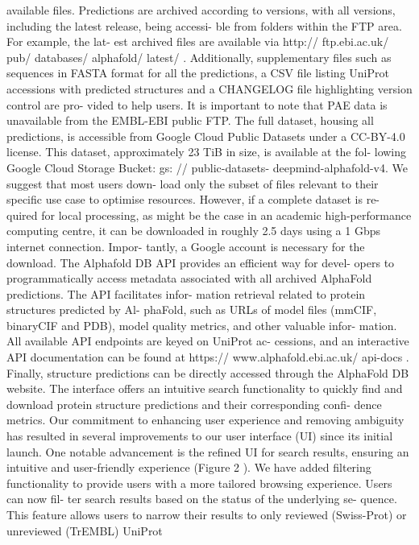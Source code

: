 available files. Predictions are archived according to versions,
with all versions, including the latest release, being accessi-
ble from folders within the FTP area. For example, the lat-
est archived files are available via http:// ftp.ebi.ac.uk/ pub/
databases/ alphafold/ latest/ . Additionally, supplementary files
such as sequences in FASTA format for all the predictions, a
CSV file listing UniProt accessions with predicted structures
and a CHANGELOG file highlighting version control are pro-
vided to help users. It is important to note that PAE data is
unavailable from the EMBL-EBI public FTP.
The full dataset, housing all predictions, is accessible from
Google Cloud Public Datasets under a CC-BY-4.0 license. This
dataset, approximately 23 TiB in size, is available at the fol-
lowing Google Cloud Storage Bucket: gs: // public-datasets-
deepmind-alphafold-v4. We suggest that most users down-
load only the subset of files relevant to their specific use case
to optimise resources. However, if a complete dataset is re-
quired for local processing, as might be the case in an academic
high-performance computing centre, it can be downloaded in
roughly 2.5 days using a 1 Gbps internet connection. Impor-
tantly, a Google account is necessary for the download.
The Alphafold DB API provides an efficient way for devel-
opers to programmatically access metadata associated with
all archived AlphaFold predictions. The API facilitates infor-
mation retrieval related to protein structures predicted by Al-
phaFold, such as URLs of model files (mmCIF, binaryCIF
and PDB), model quality metrics, and other valuable infor-
mation. All available API endpoints are keyed on UniProt ac-
cessions, and an interactive API documentation can be found
at https:// www.alphafold.ebi.ac.uk/ api-docs .
Finally, structure predictions can be directly accessed
through the AlphaFold DB website. The interface offers an
intuitive search functionality to quickly find and download
protein structure predictions and their corresponding confi-
dence metrics. Our commitment to enhancing user experience
and removing ambiguity has resulted in several improvements
to our user interface (UI) since its initial launch. One notable
advancement is the refined UI for search results, ensuring an
intuitive and user-friendly experience (Figure 2 ).
We have added filtering functionality to provide users with
a more tailored browsing experience. Users can now fil-
ter search results based on the status of the underlying se-
quence. This feature allows users to narrow their results to
only reviewed (Swiss-Prot) or unreviewed (TrEMBL) UniProt
